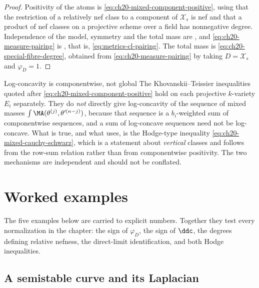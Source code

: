 \begin{proof}
Positivity of the atoms is \eqref{eq:ch20-mixed-component-positive}, using
that the restriction of a relatively nef class to a component of
$\mathcal X_s$ is nef and that a product of nef classes on a projective
scheme over a field has nonnegative degree.  Independence of the model,
symmetry and the total mass are , and
\eqref{eq:ch20-measure-pairing} is
, that is,
\eqref{eq:metrics-cl-pairing}.  The total mass is
\eqref{eq:ch20-special-fibre-degree}, obtained from
\eqref{eq:ch20-measure-pairing} by taking $D=\mathcal X_s$ and
$\varphi_D=1$.
\end{proof}

\begin{warning}{Log-concavity is componentwise, not global}
The Khovanskii--Teissier inequalities quoted after
\eqref{eq:ch20-mixed-component-positive} hold on each projective
$k$-variety $E_i$ separately.  They do \emph{not} directly give
log-concavity of the sequence of mixed masses
$\int\MA(\theta^{(j)},\theta'^{(n-j)})$, because that sequence is a
$b_i$-weighted sum of componentwise sequences, and a sum of log-concave
sequences need not be log-concave.  What is true, and what
 uses, is the Hodge-type inequality
\eqref{eq:ch20-mixed-cauchy-schwarz}, which is a statement about
\emph{vertical} classes and follows from the row-sum relation rather than
from componentwise positivity.  The two mechanisms are independent and
should not be conflated.
\end{warning}

\section{Worked examples}
\label{sec:ch20-examples}

The five examples below are carried to explicit numbers.  Together they test
every normalization in the chapter: the sign of $\varphi_D$, the sign of
$\ddc$, the degrees defining relative nefness, the direct-limit
identification, and both Hodge inequalities.

\subsection{A semistable curve and its Laplacian}
\label{sec:ch20-ex-curve}

